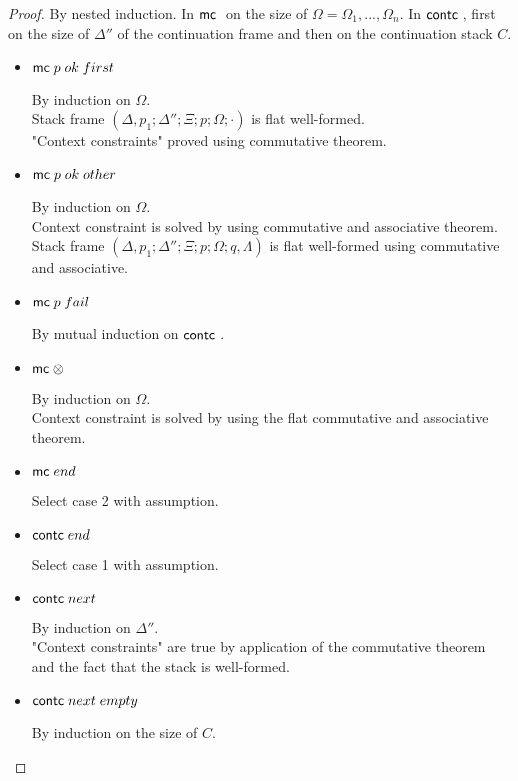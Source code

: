 \begin{proof}
   By nested induction. In $\mathsf{mc} \;$ on the size of $\Omega = \Omega_1, ..., \Omega_n$. In $\mathsf{contc} \;$, first on the size of $\Delta''$ of the continuation frame and then on the continuation stack $C$.
   
   \begin{itemize}
      \item $\mathsf{mc} \; p \; ok \; first$
      
      By induction on $\Omega$.\\
      Stack frame $(\Delta, p_1; \Delta''; \Xi; p; \Omega; \cdot)$ is flat well-formed. \\
      "Context constraints" proved using commutative theorem.\\
      
      \item $\mathsf{mc} \; p \; ok \; other$
      
      By induction on $\Omega$.\\
      Context constraint is solved by using commutative and associative theorem. \\
      Stack frame $(\Delta, p_1; \Delta''; \Xi; p; \Omega; q, \Lambda)$ is flat well-formed using commutative and associative. \\
      
      \item $\mathsf{mc} \; p \; fail$
      
      By mutual induction on $\mathsf{contc} \;$.
      
      \item $\mathsf{mc} \; \otimes$
      
      By induction on $\Omega$. \\
      Context constraint is solved by using the flat commutative and associative theorem.\\
      
      \item $\mathsf{mc} \; end$
      
      Select case 2 with assumption.
      
      \item $\mathsf{contc} \; end$
      
      Select case 1 with assumption.
      
      \item $\mathsf{contc} \; next$
      
      By induction on $\Delta''$.\\
      "Context constraints" are true by application of the commutative theorem and the fact that the stack is well-formed.\\
      
      \item $\mathsf{contc} \; next \; empty$
      
      By induction on the size of $C$.
      
   \end{itemize}
\end{proof}

